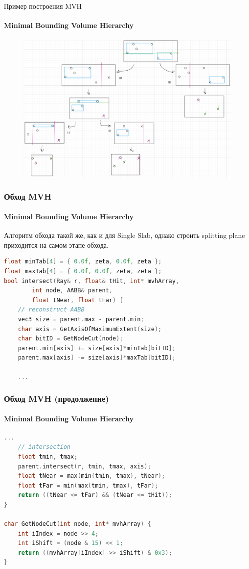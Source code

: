 \begin{frame}[t]{Пример построения MVH}
    \framesubtitle{Minimal Bounding Volume Hierarchy}
    \begin{figure}
        \includegraphics[keepaspectratio, width=\textwidth]{res/mvh.png}
    \end{figure}
\end{frame}

\begin{frame}[fragile]
    \frametitle{Обход MVH}
    \framesubtitle{Minimal Bounding Volume Hierarchy}

    Алгоритм обхода такой же, как и для Single Slab, однако строить splitting plane приходится на самом этапе обхода.

    \begin{lstlisting}[language=C++,basicstyle=\ttfamily,keywordstyle=\color{blue}]
float minTab[4] = { 0.0f, zeta, 0.0f, zeta };
float maxTab[4] = { 0.0f, 0.0f, zeta, zeta };
bool intersect(Ray& r, float& tHit, int* mvhArray,
        int node, AABB& parent,
        float tNear, float tFar) {
    // reconstruct AABB
    vec3 size = parent.max - parent.min;
    char axis = GetAxisOfMaximumExtent(size);
    char bitID = GetNodeCut(node);
    parent.min[axis] += size[axis]*minTab[bitID];
    parent.max[axis] -= size[axis]*maxTab[bitID];

    ...
    \end{lstlisting}

\end{frame}

\begin{frame}[fragile]
    \frametitle{Обход MVH (продолжение)}
    \framesubtitle{Minimal Bounding Volume Hierarchy}

    \begin{lstlisting}[language=C++,basicstyle=\ttfamily,keywordstyle=\color{blue}]
    ...
    // intersection
    float tmin, tmax;
    parent.intersect(r, tmin, tmax, axis);
    float tNear = max(min(tmin, tmax), tNear);
    float tFar = min(max(tmin, tmax), tFar);
    return ((tNear <= tFar) && (tNear <= tHit));
}

char GetNodeCut(int node, int* mvhArray) {
    int iIndex = node >> 4;
    int iShift = (node & 15) << 1;
    return ((mvhArray[iIndex] >> iShift) & 0x3);
}
    \end{lstlisting}

\end{frame}


